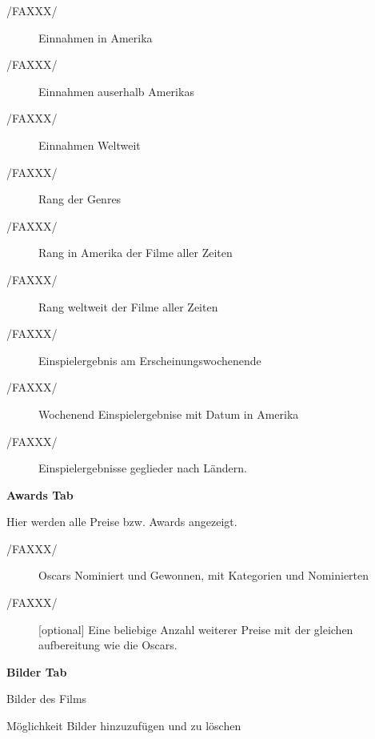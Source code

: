 \begin{description}
\begin{description}
			\begin{description}
				\item[/FAXXX/] Einnahmen in Amerika
				\item[/FAXXX/] Einnahmen auserhalb Amerikas
				\item[/FAXXX/] Einnahmen Weltweit
				\item[/FAXXX/] Rang der Genres
				\item[/FAXXX/] Rang in Amerika der Filme aller Zeiten
				\item[/FAXXX/] Rang weltweit der Filme aller Zeiten
				\item[/FAXXX/] Einspielergebnis am Erscheinungswochenende
				\item[/FAXXX/] Wochenend Einspielergebnise mit Datum in Amerika
				\item[/FAXXX/] Einspielergebnisse geglieder nach Ländern.			
			\end{description}
		\item[/FAXXX/] \textbf{Awards Tab}
		\item Hier werden alle Preise bzw. Awards angezeigt.
			\begin{description}
				\item[/FAXXX/] Oscars Nominiert und Gewonnen, mit Kategorien und Nominierten
				\item[/FAXXX/] [optional] Eine beliebige Anzahl weiterer Preise mit der gleichen aufbereitung wie die Oscars.
			\end{description}
		\item[/FAXXX/] \textbf{Bilder Tab}
		\begin{description}
			\item Bilder des Films
			\item Möglichkeit Bilder hinzuzufügen und zu löschen
		\end{description}
	\end{description}
\end{description}


\newpage
